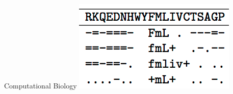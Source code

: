 \documentclass[compress]{beamer}
\begin{document}
{\begin{columns}
   \begin{block}{Computational Biology}
     \centering
     \includegraphics[width=0.4\linewidth]{general_figures/protein} \\
     \small
     \cite{nguyen-13b,hu-13:coalescent}
   \end{block}


\end{columns}

}
\end{document}
